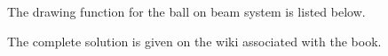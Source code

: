 The drawing function for the ball on beam system is listed below.

%

\ifsolutionmanual

\else

\fi

The complete solution is given on the wiki associated with the book.





   